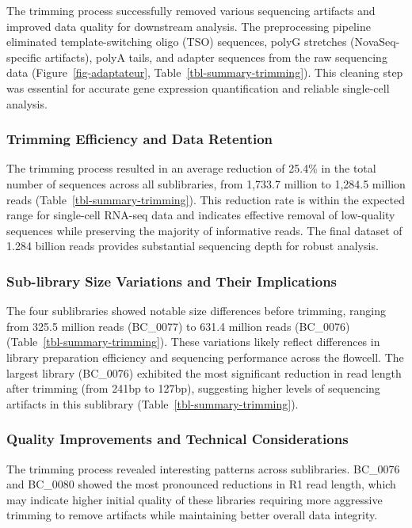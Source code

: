 \documentclass[
  11pt,
  a4paper,
]{report}
\begin{document}
The trimming process successfully removed various sequencing artifacts
and improved data quality for downstream analysis. The preprocessing
pipeline eliminated template-switching oligo (TSO) sequences, polyG
stretches (NovaSeq-specific artifacts), polyA tails, and adapter
sequences from the raw sequencing data (Figure~\ref{fig-adaptateur},
Table~\ref{tbl-summary-trimming}). This cleaning step was essential for
accurate gene expression quantification and reliable single-cell
analysis.

\subsubsection{Trimming Efficiency and Data
Retention}\label{trimming-efficiency-and-data-retention}

The trimming process resulted in an average reduction of 25.4\% in the
total number of sequences across all sublibraries, from 1,733.7 million
to 1,284.5 million reads (Table~\ref{tbl-summary-trimming}). This
reduction rate is within the expected range for single-cell RNA-seq data
and indicates effective removal of low-quality sequences while
preserving the majority of informative reads. The final dataset of 1.284
billion reads provides substantial sequencing depth for robust analysis.

\subsubsection{Sub-library Size Variations and Their
Implications}\label{sub-library-size-variations-and-their-implications}

The four sublibraries showed notable size differences before trimming,
ranging from 325.5 million reads (BC\_0077) to 631.4 million reads
(BC\_0076) (Table~\ref{tbl-summary-trimming}). These variations likely
reflect differences in library preparation efficiency and sequencing
performance across the flowcell. The largest library (BC\_0076)
exhibited the most significant reduction in read length after trimming
(from 241bp to 127bp), suggesting higher levels of sequencing artifacts
in this sublibrary (Table~\ref{tbl-summary-trimming}).

\subsubsection{Quality Improvements and Technical
Considerations}\label{quality-improvements-and-technical-considerations}

The trimming process revealed interesting patterns across sublibraries.
BC\_0076 and BC\_0080 showed the most pronounced reductions in R1 read
length, which may indicate higher initial quality of these libraries
requiring more aggressive trimming to remove artifacts while maintaining
better overall data integrity.
\end{document}
